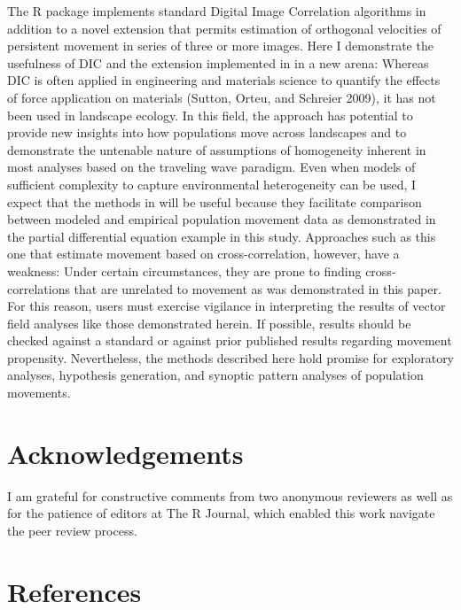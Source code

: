 The  R package implements standard Digital Image Correlation algorithms in addition to a novel extension that permits estimation of orthogonal velocities of persistent movement in series of three or more images. Here I demonstrate the usefulness of DIC and the extension implemented in  in a new arena: Whereas DIC is often applied in engineering and materials science to quantify the effects of force application on materials (Sutton, Orteu, and Schreier 2009), it has not been used in landscape ecology. In this field, the approach has potential to provide new insights into how populations move across landscapes and to demonstrate the untenable nature of assumptions of homogeneity inherent in most analyses based on the traveling wave paradigm. Even when models of sufficient complexity to capture environmental heterogeneity can be used, I expect that the methods in  will be useful because they facilitate comparison between modeled and empirical population movement data as demonstrated in the partial differential equation example in this study. Approaches such as this one that estimate movement based on cross-correlation, however, have a weakness: Under certain circumstances, they are prone to finding cross-correlations that are unrelated to movement as was demonstrated in this paper. For this reason, users must exercise vigilance in interpreting the results of vector field analyses like those demonstrated herein. If possible, results should be checked against a standard or against prior published results regarding movement propensity. Nevertheless, the methods described here hold promise for exploratory analyses, hypothesis generation, and synoptic pattern analyses of population movements.

\hypertarget{acknowledgements}{%
\section{Acknowledgements}\label{acknowledgements}}

I am grateful for constructive comments from two anonymous reviewers as well as for the patience of editors at The R Journal, which enabled this work navigate the peer review process.

\hypertarget{references}{%
\section*{References}\label{references}}

